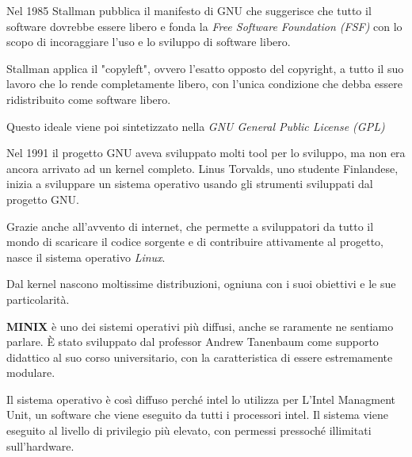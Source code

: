 \spacer
Nel 1985 Stallman pubblica il manifesto di GNU che suggerisce che tutto il software dovrebbe essere libero e fonda la \textit{Free Software Foundation (FSF)} con lo scopo di incoraggiare l'uso e lo sviluppo di software libero.

Stallman applica il "copyleft", ovvero l'esatto opposto del copyright, a tutto il suo lavoro che lo rende completamente libero, con l'unica condizione che debba essere ridistribuito come software libero.

Questo ideale viene poi sintetizzato nella \textit{GNU General Public License (GPL)}

\spacer
Nel 1991 il progetto GNU aveva sviluppato molti tool per lo sviluppo, ma non era ancora arrivato ad un kernel completo. Linus Torvalds, uno studente Finlandese, inizia a sviluppare un sistema operativo usando gli strumenti sviluppati dal progetto GNU.

Grazie anche all'avvento di internet, che permette a sviluppatori da tutto il mondo di scaricare il codice sorgente e di contribuire attivamente al progetto, nasce il sistema operativo \textit{Linux}.

\spacer
Dal kernel nascono moltissime distribuzioni, ogniuna con i suoi obiettivi e le sue particolarità.

\begin{note}
    \textbf{MINIX} è uno dei sistemi operativi più diffusi, anche se raramente ne sentiamo parlare. È stato sviluppato dal professor Andrew Tanenbaum come supporto didattico al suo corso universitario, con la caratteristica di essere estremamente modulare.

    Il sistema operativo è così diffuso perché intel lo utilizza per L'Intel Managment Unit, un software che viene eseguito da tutti i processori intel. Il sistema viene eseguito al livello di privilegio più elevato, con permessi pressoché illimitati sull'hardware.
\end{note}